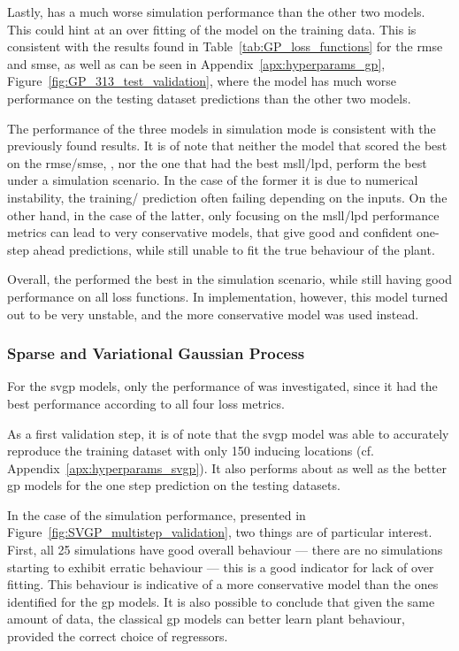 Lastly,  has a much worse simulation performance than the other
two models. This could hint at an over fitting of the model on the training data.
This is consistent with the results found in Table~\ref{tab:GP_loss_functions}
for the \acrshort{rmse} and \acrshort{smse}, as well as can be seen in
Appendix~\ref{apx:hyperparams_gp}, Figure~\ref{fig:GP_313_test_validation},
where the model has much worse performance on the testing dataset predictions
than the other two models.

The performance of the three models in simulation mode is consistent with the
previously found results. It is of note that neither the model that scored the
best on the \acrshort{rmse}/\acrshort{smse}, , nor the one that
had the best \acrshort{msll}/\acrshort{lpd}, perform the best under a simulation
scenario. In the case of the former it is due to numerical instability, the
training/ prediction often failing depending on the inputs. On the other hand,
in the case of the latter, only focusing on the \acrshort{msll}/\acrshort{lpd}
performance metrics can lead to very conservative models, that give good and
confident one-step ahead predictions, while still unable to fit the true
behaviour of the plant.

Overall, the  performed the best in the simulation scenario,
while still having good performance on all loss functions. In implementation,
however, this model turned out to be very unstable, and the more conservative
 model was used instead.

\clearpage

    \subsubsection{Sparse and Variational Gaussian Process}

For the \acrshort{svgp} models, only the performance of  was
investigated, since it had the best performance according to all four loss
metrics. 

As a first validation step, it is of note that the \acrshort{svgp} model was
able to accurately reproduce the training dataset with only 150 inducing
locations (cf.  Appendix~\ref{apx:hyperparams_svgp}). It also performs about as
well as the better \acrshort{gp} models for the one step prediction on the
testing datasets.

In the case of the simulation performance, presented in
Figure~\ref{fig:SVGP_multistep_validation}, two things are of particular
interest. First, all 25 simulations have good overall behaviour --- there are no
simulations starting to exhibit erratic behaviour --- this is a good indicator
for lack of over fitting. This behaviour is indicative of a more conservative
model than the ones identified for the \acrshort{gp} models. It is also possible
to conclude that given the same amount of data, the classical \acrshort{gp}
models can better learn plant behaviour, provided the correct choice of
regressors.

